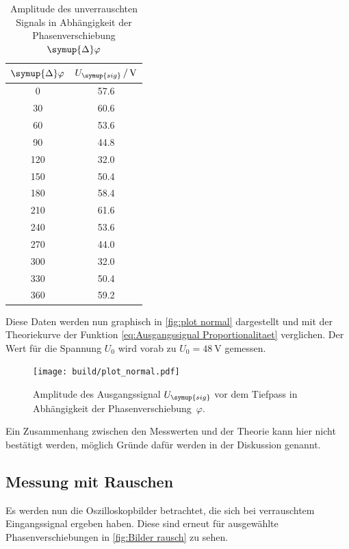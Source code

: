 \begin{table} [H]
  \centering
  \caption{Amplitude des unverrauschten Signals in Abhängigkeit der Phasenverschiebung $\symup{\Delta}\varphi$}
  \label{tab:unverrauscht}
  \begin{tabular}{S[table-format=3.0] S[table-format=2.1]}
    \toprule
    {$\symup{\Delta}\varphi$} & {$U_{\symup{sig}}\,/\,\unit{\volt}$} \\
    	  & 57.6 \\
    30	& 60.6 \\
    60	& 53.6 \\
    90	& 44.8 \\
    120	& 32.0 \\
    150	& 50.4 \\
    180	& 58.4 \\
    210	& 61.6 \\
    240	& 53.6 \\
    270	& 44.0 \\
    300	& 32.0 \\
    330	& 50.4 \\
    360	& 59.2 \\
    \bottomrule
  \end{tabular}
\end{table}

Diese Daten werden nun graphisch in \autoref{fig:plot normal} dargestellt und mit der Theoriekurve der Funktion 
\eqref{eq:Ausgangssignal Proportionalitaet} verglichen. Der Wert für die Spannung $U_{0}$ wird vorab zu $U_{0}=\qty{48}{\volt}$ 
gemessen.

\begin{figure} [H]
  \centering
  \texttt{[image: build/plot\_normal.pdf]}
  \caption{Amplitude des Ausgangssignal $U_{\symup{sig}}$ vor dem Tiefpass in Abhängigkeit der Phasenverschiebung~$\varphi$.}
  \label{fig:plot normal}
\end{figure}

Ein Zusammenhang zwischen den Messwerten und der Theorie kann hier nicht bestätigt werden, möglich Gründe dafür werden in
der Diskussion genannt.

\subsection{Messung mit Rauschen}
\label{sec:mit rauschen}

Es werden nun die Oszilloskopbilder betrachtet, die sich bei verrauschtem Eingangssignal ergeben haben.
Diese sind erneut für ausgewählte Phasenverschiebungen in \autoref{fig:Bilder rausch} zu sehen.

